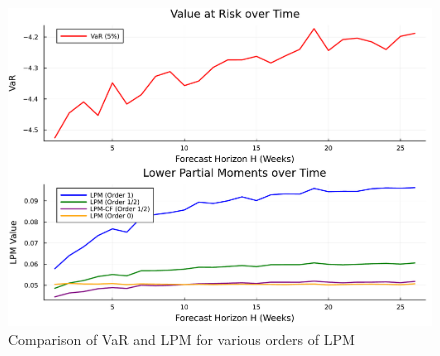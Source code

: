 \begin{figure}[H]
    \centering
    \includegraphics[width=1.0\textwidth]{figures/var_vs_lpm_alternative.pdf}
    \caption{Comparison of VaR and LPM for various orders of LPM}
    \label{fig:var_vs_lpm}
\end{figure}

